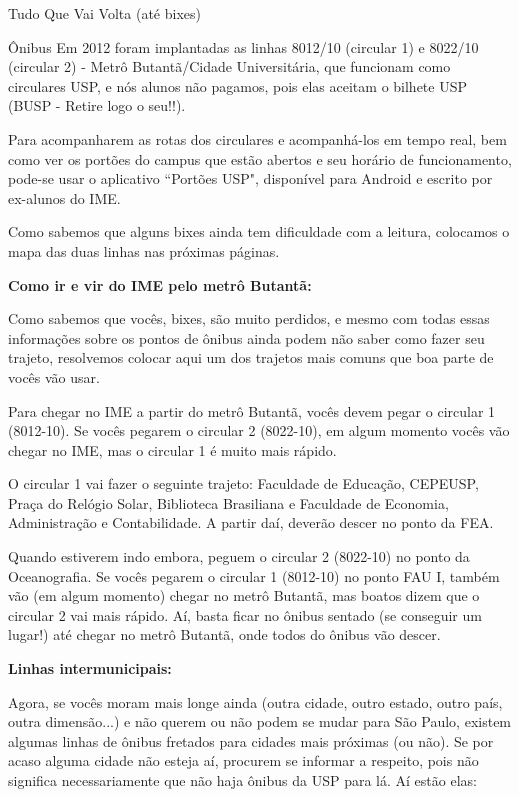 \begin{secao}{Tudo Que Vai Volta (até bixes)}
\begin{subsecao}{Ônibus}
Em 2012 foram implantadas as linhas 8012/10 (circular 1) e 8022/10 (circular 2)
- Metrô Butantã/Cidade Universitária,
que funcionam como circulares USP, e nós alunos não pagamos, pois elas aceitam
o bilhete USP (BUSP - Retire logo o seu!!).

Para acompanharem as rotas dos circulares e acompanhá-los em tempo real, bem como
ver os portões do campus que estão abertos e seu horário de funcionamento, pode-se
usar o aplicativo “Portões USP", disponível para Android e escrito por ex-alunos
do IME.

Como sabemos que alguns bixes ainda tem dificuldade com a leitura, colocamos o
mapa das duas linhas nas próximas páginas.

{\bf Como ir e vir do IME pelo metrô Butantã:}

Como sabemos que vocês, bixes, são muito perdidos, e mesmo com todas essas informações
sobre os pontos de ônibus ainda podem não saber como fazer seu trajeto, resolvemos colocar
aqui um dos trajetos mais comuns que boa parte de vocês vão usar.

Para chegar no IME a partir do metrô Butantã, vocês devem pegar o circular 1 (8012-10).
Se vocês pegarem o circular 2 (8022-10), em algum momento vocês vão chegar no IME, mas
o circular 1 é muito mais rápido.

O circular 1 vai fazer o seguinte trajeto: Faculdade de Educação, CEPEUSP, Praça do Relógio
Solar, Biblioteca Brasiliana e Faculdade de Economia, Administração e Contabilidade. A partir
daí, deverão descer no ponto da FEA.

Quando estiverem indo embora, peguem o circular 2 (8022-10) no ponto da Oceanografia. Se vocês
pegarem o circular 1 (8012-10) no ponto FAU I, também vão (em algum momento) chegar no metrô
Butantã, mas boatos dizem que o circular 2 vai mais rápido. Aí, basta ficar no ônibus sentado
(se conseguir um lugar!) até chegar no metrô Butantã, onde todos do ônibus vão descer.

{\bf Linhas intermunicipais:}

Agora, se vocês moram mais longe ainda (outra cidade, outro estado, outro país,
outra dimensão...) e não querem ou não podem se mudar para São Paulo, existem
algumas linhas de ônibus fretados para cidades mais próximas (ou não). Se por
acaso alguma cidade não esteja aí, procurem se informar a respeito, pois não significa
necessariamente que não haja ônibus da USP para lá. Aí estão elas:


\end{subsecao}
\end{secao}
